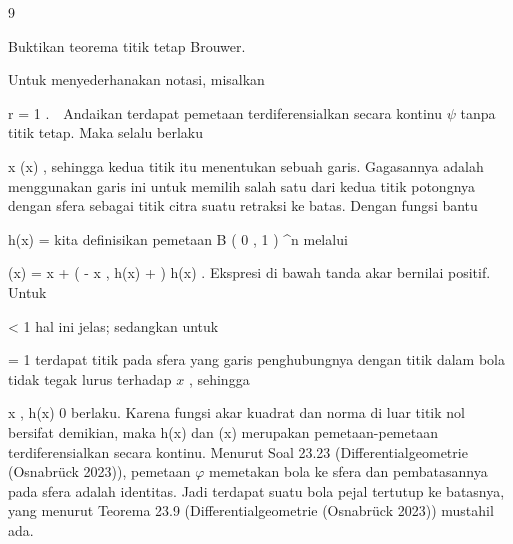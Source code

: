 {9}

{

Buktikan teorema titik tetap Brouwer.

}
{

Untuk menyederhanakan notasi, misalkan

\mavergleichskette
{\vergleichskette
{ r
}
{ = }{ 1
}
{ }{
}
{ }{
}
{ }{
}
}
{}{}{.}  Andaikan terdapat pemetaan terdiferensialkan secara kontinu $\psi$ tanpa titik tetap. Maka selalu berlaku

\mavergleichskettedisp
{\vergleichskette
{ x
}
{ \neq} { \psi(x)
}
{ } {
}
{ } {
}
{ } {
}
}
{}{}{,}
sehingga kedua titik itu menentukan sebuah garis. Gagasannya adalah menggunakan garis ini untuk memilih
 {} {}
salah satu dari kedua titik potongnya dengan sfera sebagai titik citra suatu retraksi ke batas. Dengan fungsi bantu

\mavergleichskettedisp
{\vergleichskette
{ h(x)
}
{ =} { {  }
}
{ } {
}
{ } {
}
{ } {
}
}
{}{}{}
kita definisikan pemetaan
\maabbdisp {\varphi} { B \left( 0 , 1 \right) } { \R^n
} {}
melalui

\mavergleichskettedisphandlinks
{\vergleichskettedisphandlinks
{ \varphi(x)
}
{ =} { x + \left(  - \left\langle  x  , h(x)  \right\rangle +   \right) \cdot h(x)
}
{ } {
}
{ } {
}
{ } {
}
}
{}{}{.}
Ekspresi di bawah tanda akar bernilai positif. Untuk

\mavergleichskette
{\vergleichskette
{  \Vert
}
{ < }{ 1
}
{ }{
}
{ }{
}
{ }{
}
}
{}{}{}
hal ini jelas; sedangkan untuk

\mavergleichskette
{\vergleichskette
{  \Vert
}
{ = }{ 1
}
{ }{
}
{ }{
}
{ }{
}
}
{}{}{}
terdapat titik pada sfera yang garis penghubungnya dengan titik dalam bola
 tidak tegak lurus terhadap $x$
 {} {,}
sehingga

\mavergleichskettedisp
{\vergleichskette
{ \left\langle x , h(x) \right\rangle
}
{ \neq} { 0
}
{ } {
}
{ } {
}
{ } {
}
}
{}{}{}
berlaku. Karena fungsi akar kuadrat dan norma di luar titik nol
bersifat demikian, maka
\mathkor {} {h(x)} {dan} {\varphi(x)} {}
merupakan pemetaan-pemetaan terdiferensialkan secara kontinu. Menurut
Soal 23.23 (Differentialgeometrie (Osnabrück 2023)),
pemetaan $\varphi$ memetakan bola ke sfera dan pembatasannya pada sfera adalah identitas. Jadi terdapat suatu
bola pejal tertutup ke batasnya, yang menurut
Teorema 23.9 (Differentialgeometrie (Osnabrück 2023))
mustahil ada.

 }



